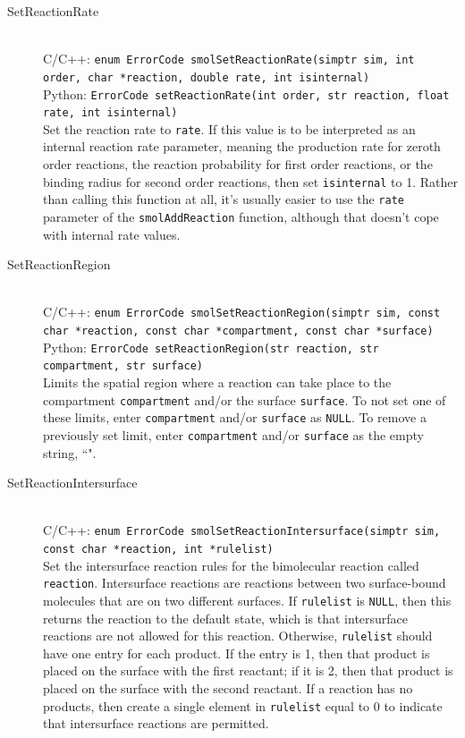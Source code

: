 \documentclass {scrbook}
\newcommand {\ttt} {\texttt}
\begin{document}
\begin{description}
\item[SetReactionRate]
\hfill \\
C/C++: \ttt{enum ErrorCode smolSetReactionRate(simptr sim, int order, char *reaction, double rate, int isinternal)}\\
Python: \ttt{ErrorCode setReactionRate(int order, str reaction, float rate, int isinternal)}\\
Set the reaction rate to \ttt{rate}. If this value is to be interpreted as an internal reaction rate parameter, meaning the production rate for zeroth order reactions, the reaction probability for first order reactions, or the binding radius for second order reactions, then set \ttt{isinternal} to 1. Rather than calling this function at all, it's usually easier to use the \ttt{rate} parameter of the \ttt{smolAddReaction} function, although that doesn't cope with internal rate values.

\item[SetReactionRegion]
\hfill \\
C/C++: \ttt{enum ErrorCode smolSetReactionRegion(simptr sim, const char *reaction, const char *compartment, const char *surface)}\\
Python: \ttt{ErrorCode setReactionRegion(str reaction, str compartment, str surface)}\\
Limits the spatial region where a reaction can take place to the compartment \ttt{compartment} and/or the surface \ttt{surface}. To not set one of these limits, enter \ttt{compartment} and/or \ttt{surface} as \ttt{NULL}. To remove a previously set limit, enter \ttt{compartment} and/or \ttt{surface} as the empty string, ``".

\item[SetReactionIntersurface]
\hfill \\
C/C++: \ttt{enum ErrorCode smolSetReactionIntersurface(simptr sim, const char *reaction, int *rulelist)}\\
Set the intersurface reaction rules for the bimolecular reaction called \ttt{reaction}. Intersurface reactions are reactions between two surface-bound molecules that are on two different surfaces. If \ttt{rulelist} is \ttt{NULL}, then this returns the reaction to the default state, which is that intersurface reactions are not allowed for this reaction. Otherwise, \ttt{rulelist} should have one entry for each product. If the entry is 1, then that product is placed on the surface with the first reactant; if it is 2, then that product is placed on the surface with the second reactant. If a reaction has no products, then create a single element in \ttt{rulelist} equal to 0 to indicate that intersurface reactions are permitted.


\end{description}
\end{document}
